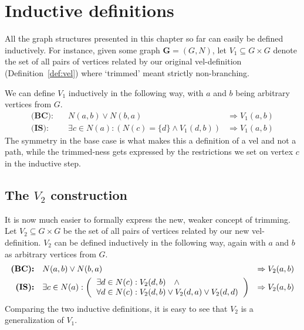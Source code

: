 


\section{Inductive definitions}
\label{sec:Inductive definitions}
All the graph structures presented in this chapter so far can easily be defined inductively.
For instance, given some graph $\mathbf{G}=(G,N)$, let $V_1 \subseteq G \times G$ denote the set of all pairs of vertices related by our original vel-definition (Definition~\ref{def:vel}) where `trimmed' meant strictly non-branching.

We can define $V_1$ inductively in the following way, with $a$ and $b$ being arbitrary vertices from $G$.
\begin{align}
  \textbf{(BC):}&\quad N(a,b) \vee N(b,a) &\Rightarrow  V_1(a,b)\\
  \textbf{(IS):}&\quad \exists c \in N(a): (N(c) =\{d\} \wedge V_1(d,b)) &\Rightarrow V_1(a,b)
\end{align}
The symmetry in the base case is what makes this a definition of a vel and not a path, while the trimmed-ness gets expressed by the restrictions we set on vertex $c$ in the inductive step.
\subsection{The $V_2$ construction}
\label{sub:The V2 construction}
It is now  much easier to formally express the new, weaker concept of trimming.
Let $V_2 \subseteq G \times G$ be the set of all pairs of vertices related by our new vel-definition.
$V_2$ can be defined inductively in the following way, again with $a$ and $b$ as arbitrary vertices from $G$.
\begin{align}
  \textbf{(BC):}&\quad N(a,b) \vee N(b,a) &\Rightarrow V_2(a,b)\label{eq:V2_BC}\\
  \textbf{(IS):}&\quad \exists c \in N(a):
  \left ( \begin{tabular}{l}
  $\exists d \in N(c): V_2(d,b) \quad \wedge$\\
  $\forall d \in N(c): V_2(d,b) \vee V_2(d,a) \vee V_2(d,d)$
  \end{tabular} \right )
  &\Rightarrow V_2(a,b)\label{eq:V2_IS}
\end{align}
Comparing the two inductive definitions, it is easy to see that $V_2$ is a generalization of $V_1$.

